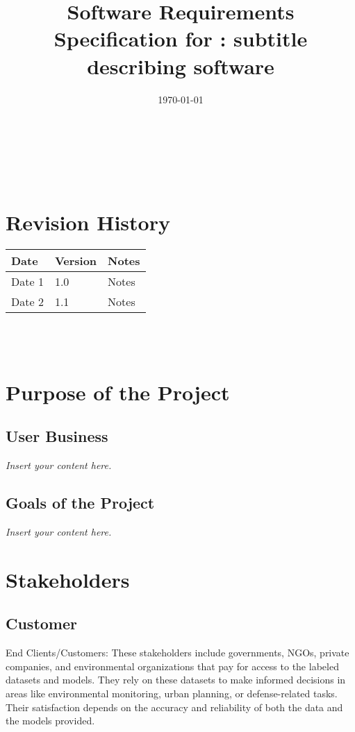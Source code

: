 \documentclass[12pt]{article}
\newcommand{\lips}{\textit{Insert your content here.}}
\begin{document}
\title{Software Requirements Specification for \progname: subtitle describing software} 
\author{\authname}
\date{\today}
	
\maketitle

~\newpage


\tableofcontents

~\newpage

\section*{Revision History}

\begin{tabularx}{\textwidth}{p{3cm}p{2cm}X}
\toprule {\textbf{Date}} & {\textbf{Version}} & {\textbf{Notes}}\\
\midrule
Date 1 & 1.0 & Notes\\
Date 2 & 1.1 & Notes\\
\bottomrule
\end{tabularx}

~\\

~\newpage
\section{Purpose of the Project}
\subsection{User Business}
\lips
\subsection{Goals of the Project}
\lips
\section{Stakeholders}

\subsection{Customer}
End Clients/Customers: These stakeholders include governments, NGOs, private companies, and environmental organizations that pay for access to the labeled datasets and models. They rely on these datasets to make informed decisions in areas like environmental monitoring, urban planning, or defense-related tasks. Their satisfaction depends on the accuracy and reliability of both the data and the models provided.
\end{document}
